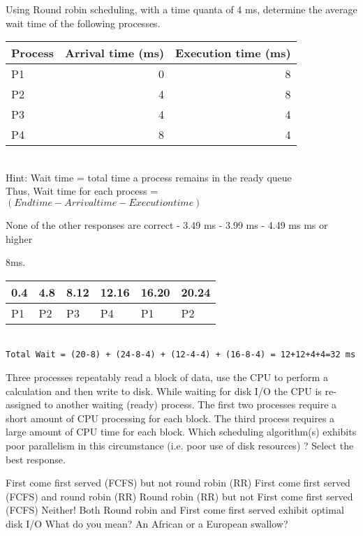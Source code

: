 \variant
Using Round robin scheduling, with a time quanta of 4 ms, determine the average wait time of the following processes. 

\begin{tabular}{ | l | r | r  |}
\hline
Process & Arrival time (ms) & Execution time (ms)  \\ \hline
P1 & 0 & 8 \\ \hline
P2 & 4 & 8 \\ \hline
P3 & 4 & 4 \\ \hline
P4 & 8 & 4 \\ \hline
\end{tabular}
\\
Hint: Wait time = total time a process remains in the ready queue\\
Thus, Wait time for each process = $(Endtime - Arrivaltime - Executiontime)$
\begin{answers}
\answer  None of the other responses are correct
 - 3.49 ms
 - 3.99 ms
 - 4.49 ms
 ms or higher
\end{answers}
\begin{solution}
8ms.
\\
\begin{tabular}{ | l | l | l | l | l | l |}
\hline
0.4  &  4.8 &  8.12 & 12.16 & 16.20 & 20.24 \\ \hline
P1   &  P2  &   P3  &   P4  &    P1  &    P2 \\ \hline
\end{tabular}
\\
{\tt Total Wait = (20-8) + (24-8-4) + (12-4-4) + (16-8-4) = 12+12+4+4=32 ms}
\end{solution}

\variant
Three processes repeatably read a block of data, use the CPU to perform a calculation and then write to disk. While waiting for disk I/O the CPU is re-assigned to another waiting (ready) process. The first two processes require a short amount of CPU processing for each block. The third process requires a large amount of CPU time for each block. Which scheduling algorithm(s) exhibits poor parallelism in this circumstance (i.e. poor use of disk resources) ? Select the best response.
\begin{answers}
\correctanswer First come first served (FCFS) but not round robin (RR)
\answer First come first served (FCFS) and round robin (RR)
\answer Round robin (RR) but not First come first served (FCFS)
\answer Neither! Both Round robin and First come first served exhibit optimal disk I/O
\answer What do you mean? An African or a European swallow?
\end{answers}
\begin{solution}
\end{solution}

